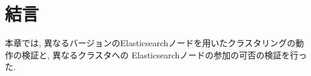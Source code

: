 








\section{結言}

本章では, 異なるバージョンのElasticsearchノードを用いたクラスタリングの動作の検証と, 異なるクラスタへの Elasticsearchノードの参加の可否の検証を行った.

